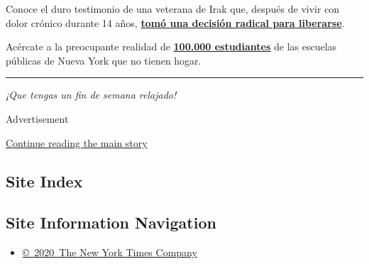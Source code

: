 Conoce el duro testimonio de una veterana de Irak que, después de vivir
con dolor crónico durante 14 años,
\textbf{\href{https://www.nytimes3xbfgragh.onion/interactive/2020/09/10/magazine/amputation-implanted-prosthetic-limb-osseointegration.html}{tomó
una decisión radical para liberarse}}.

Acércate a la preocupante realidad de
\textbf{\href{https://www.nytimes3xbfgragh.onion/interactive/2020/09/09/magazine/homeless-students.html}{100.000
estudiantes}} de las escuelas públicas de Nueva York que no tienen
hogar.

\begin{center}\rule{0.5\linewidth}{\linethickness}\end{center}

\emph{¡Que tengas un fin de semana relajado!}

Advertisement

\protect\hyperlink{after-bottom}{Continue reading the main story}

\hypertarget{site-index}{%
\subsection{Site Index}\label{site-index}}

\hypertarget{site-information-navigation}{%
\subsection{Site Information
Navigation}\label{site-information-navigation}}

\begin{itemize}
\tightlist
\item
  \href{https://help.nytimes3xbfgragh.onion/hc/en-us/articles/115014792127-Copyright-notice}{©~2020~The
  New York Times Company}
\end{itemize}

